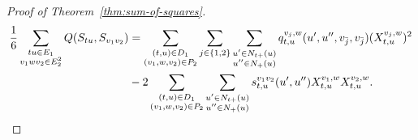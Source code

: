 \documentclass[pdflatex,sn-mathphys-num]{sn-jnl}
\theoremstyle{thmstyleone}
\begin{document}
\begin{proof}[Proof of Theorem~\ref{thm:sum-of-squares}]
\begin{align}
\frac16\sum_{\substack{tu\in E_1\\v_1wv_2\in E_2^2}}
Q(S_{tu},S_{v_1v_2})
&=\sum_{\substack{(t,u)\in D_1\\(v_1,w,v_2)\in P_2}}
\sum_{j\in\{1,2\}}
\sum_{\substack{u'\in N_{t+}(u)\\u''\in N_+(u)}}
q_{t,u}^{v_j,w}(u',u'',v_{\bar j},v_{\bar j})
(X_{t,u}^{v_j,w})^2                                        \notag\\
&-2\sum_{\substack{(t,u)\in D_1\\(v_1,w,v_2)\in P_2}}
\sum_{\substack{u'\in N_{t+}(u)\\u''\in N_+(u)}}
s_{t,u}^{v_1v_2}(u',u'')X_{t,u}^{v_1,w}X_{t,u}^{v_2,w}.
                                                               \label{eq:edge-path}
\end{align}


\end{proof}
\end{document}
